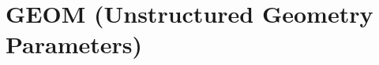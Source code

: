 \documentclass[12pt]{article}
\begin{document}
%

\section{\texorpdfstring{{\ct GEOM}}{GEOM} (Unstructured Geometry Parameters)}
\end{document}

